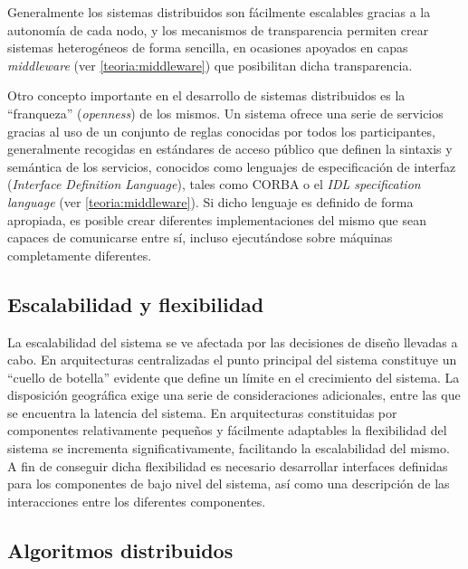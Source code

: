 Generalmente los sistemas distribuidos son fácilmente escalables gracias a la autonomía de cada nodo, y los mecanismos de transparencia permiten crear sistemas heterogéneos de forma sencilla, en ocasiones apoyados en capas \textit{middleware} (ver \ref{teoria:middleware}) que posibilitan dicha transparencia.

Otro concepto importante en el desarrollo de sistemas distribuidos es la ``franqueza'' (\textit{openness}) de los mismos. Un sistema ofrece una serie de servicios gracias al uso de un conjunto de reglas conocidas por todos los participantes, generalmente recogidas en estándares de acceso público que definen la sintaxis y semántica de los servicios, conocidos como lenguajes de especificación de interfaz (\textit{Interface Definition Language}), tales como CORBA\cite{corba} o el \textit{IDL specification language}\cite{idl} (ver \ref{teoria:middleware}). Si dicho lenguaje es definido de forma apropiada, es posible crear diferentes implementaciones del mismo que sean capaces de comunicarse entre sí, incluso ejecutándose sobre máquinas completamente diferentes.

\subsection{Escalabilidad y flexibilidad}

La escalabilidad del sistema se ve afectada por las decisiones de diseño llevadas a cabo. En arquitecturas centralizadas el punto principal del sistema constituye un ``cuello de botella'' evidente que define un límite en el crecimiento del sistema. La disposición geográfica exige una serie de consideraciones adicionales, entre las que se encuentra la latencia del sistema. En arquitecturas constituidas por componentes relativamente pequeños y fácilmente adaptables la flexibilidad del sistema se incrementa significativamente, facilitando la escalabilidad del mismo. A fin de conseguir dicha flexibilidad es necesario desarrollar interfaces definidas para los componentes de bajo nivel del sistema, así como una descripción de las interacciones entre los diferentes componentes.


\subsection{Algoritmos distribuidos}

